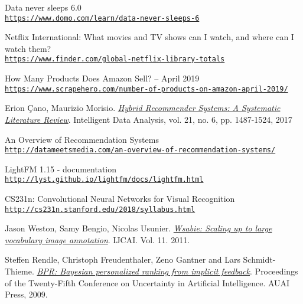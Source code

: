 \begin{thebibliography}{9}

	\hypertarget{domo}{} 
	Data never sleeps 6.0
	\\\texttt{\url{https://www.domo.com/learn/data-never-sleeps-6}}
	
	\hypertarget{finder}{} 
	Netflix International: What movies and TV shows can I watch, and where can I watch them?
	\\\texttt{\url{https://www.finder.com/global-netflix-library-totals}}

	\hypertarget{scrapehero}{} 
	How Many Products Does Amazon Sell? – April 2019
	\\\texttt{\url{https://www.scrapehero.com/number-of-products-on-amazon-april-2019/}}
	
	\hypertarget{ErionCanoMaurizioMorisio}{} 
	Erion Çano, Maurizio Morisio.
	\textit{\href{https://arxiv.org/abs/1901.03888}{Hybrid Recommender Systems: A Systematic Literature Review}}.
	Intelligent Data Analysis, vol. 21, no. 6, pp. 1487-1524, 2017
	
	\hypertarget{datameetsmedia}{} 
	An Overview of Recommendation Systems
	\\\texttt{\url{http://datameetsmedia.com/an-overview-of-recommendation-systems/}}
	
	\hypertarget{lightfm}{} 
	LightFM 1.15 - documentation
	\\\texttt{\url{http://lyst.github.io/lightfm/docs/lightfm.html}}
	
	\hypertarget{cs231n}{} 
	CS231n: Convolutional Neural Networks for Visual Recognition
	\\\texttt{\url{http://cs231n.stanford.edu/2018/syllabus.html}}
	
	\hypertarget{JasonWestonSamyBengioNicolasUsunier}{} 
	Jason Weston, Samy Bengio, Nicolas Usunier.
	\textit{\href{http://www.thespermwhale.com/jaseweston/papers/wsabie-ijcai.pdf}{Wsabie: Scaling up to large vocabulary image annotation}}.
	IJCAI. Vol. 11. 2011.
	
	\hypertarget{SteffenRendleChristophFreudenthalerZenoGantnerLarsSchmidtThieme}{} 
	Steffen Rendle, Christoph Freudenthaler, Zeno Gantner and Lars Schmidt-Thieme.
	\textit{\href{http://www.thespermwhale.com/jaseweston/papers/wsabie-ijcai.pdf}{BPR: Bayesian personalized ranking from implicit feedback}}.
	Proceedings of the Twenty-Fifth Conference on Uncertainty in Artificial Intelligence. AUAI Press, 2009.
	
\end{thebibliography}
